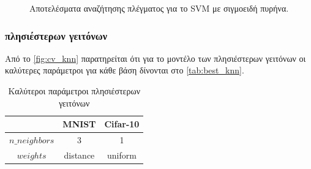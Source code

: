 \documentclass[a4paper]{article}
\begin{document}
\begin{figure}[H]
    \caption{Αποτελέσματα αναζήτησης πλέγματος για το SVM με σιγμοειδή πυρήνα.}
    \label{fig:cv_sigmoid}
\end{figure}

\subsubsection{πλησιέστερων γειτόνων}

Από το \autoref{fig:cv_knn} παρατηρείται ότι για το μοντέλο των πλησιέστερων
γειτόνων οι καλύτερες παράμετροι για κάθε βάση δίνονται στο
\autoref{tab:best_knn}.

\begin{table}[h]
\centering
\begin{tabular}{|c|c|c|}
\hline
               & MNIST    & Cifar-10 \\ \hline
$n\_neighbors$ & 3        & 1        \\ \hline
$weights$      & distance & uniform  \\ \hline
\end{tabular}
\caption{Καλύτεροι παράμετροι πλησιέστερων γειτόνων}
\label{tab:best_knn}
\end{table}
\end{document}
